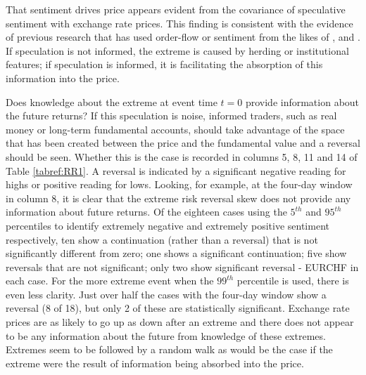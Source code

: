 \documentclass{article}
\begin{document}
That sentiment drives price appears evident from the covariance of speculative sentiment with exchange rate prices. This finding is consistent with the evidence of previous research that has used order-flow or sentiment from the likes of \citet{Evans2002Order}, \citet{FuturesSanders} and \citet{FuturesWang}. If speculation is not informed, the extreme is caused by herding or institutional features; if speculation is informed, it is facilitating the absorption of this information into the price. 

Does knowledge about the extreme at event time $t = 0$ provide information about the future returns?  If this speculation is noise, informed traders, such as real money or long-term fundamental accounts, should take advantage of the space that has been created between the price and the fundamental value and a reversal should be seen.  Whether this is the case is recorded in columns 5, 8, 11 and 14 of Table \ref{tabref:RR1}. A reversal is indicated by a significant negative reading for highs or positive reading for lows.   Looking, for example, at the four-day window in column 8, it is clear that the extreme risk reversal skew does not provide any information about future returns.  Of the eighteen cases using the $5^{th}$ and $95^{th}$ percentiles to identify extremely negative and extremely positive sentiment respectively, ten show a continuation (rather than a reversal) that is not significantly different from zero; one shows a significant continuation; five show reversals that are not significant; only two show significant reversal - EURCHF in each case.  For the more extreme event when the $99^{th}$ percentile is used, there is even less clarity.  Just over half the cases with the four-day window show a reversal (8 of 18), but only 2 of these are statistically significant. Exchange rate prices are as likely to go up as down after an extreme and there does not appear to be any information about the future from knowledge of these extremes. Extremes seem to be followed by a random walk as would be the case if the extreme were the result of information being absorbed into the price.  
\end{document}
